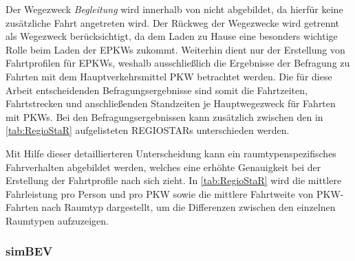 

Der Wegezweck \textit{Begleitung} wird innerhalb von  nicht abgebildet, da hierfür keine zusätzliche Fahrt angetreten wird.
Der Rückweg der Wegezwecke wird getrennt als Wegezweck \nH berücksichtigt, da dem Laden zu Hause eine besonders wichtige Rolle beim Laden der \glspl{EPKW} zukommt.
Weiterhin dient  nur der Erstellung von Fahrtprofilen für \glspl{EPKW}, weshalb ausschließlich die Ergebnisse der Befragung zu Fahrten mit dem Hauptverkehrsmittel \gls{PKW} betrachtet werden.
Die für diese Arbeit entscheidenden Befragungsergebnisse sind somit die Fahrtzeiten, Fahrtstrecken und anschließenden Standzeiten je Hauptwegezweck für Fahrten mit \glspl{PKW}.
Bei den Befragungsergebnissen kann zusätzlich zwischen den in \autoref{tab:RegioStaR} aufgelisteten \glspl{REGIOSTAR} unterschieden werden.



Mit Hilfe dieser detaillierteren Unterscheidung kann ein raumtypenspezifisches Fahrverhalten abgebildet werden, welches eine erhöhte Genauigkeit bei der Erstellung der Fahrtprofile nach sich zieht.
In \autoref{tab:RegioStaR} wird die mittlere Fahrleistung pro Person und pro \gls{PKW} sowie die mittlere Fahrtweite von \gls{PKW}-Fahrten nach Raumtyp dargestellt, um die Differenzen zwischen den einzelnen Raumtypen aufzuzeigen.




\subsubsection{simBEV}


